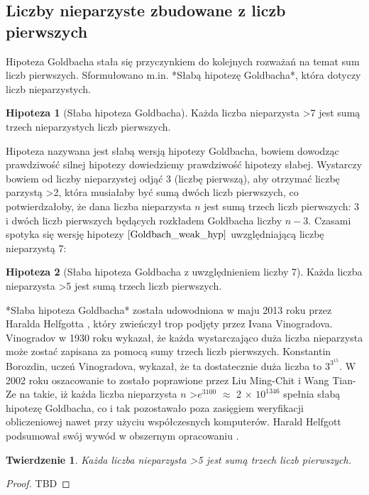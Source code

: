 \documentclass[10pt,onecolumn]{article}
\newtheorem{theorem}{Twierdzenie}
\theoremstyle{definition}
\theoremstyle{hypothesis}
\newtheorem{hypothesis}{Hipoteza}
\theoremstyle{capability}
\begin{document}
\subsection{Liczby nieparzyste zbudowane z liczb pierwszych}

Hipoteza Goldbacha stała się przyczynkiem do kolejnych rozważań na temat sum liczb pierwszych. Sformułowano m.in. *Słabą hipotezę Goldbacha*, która dotyczy liczb nieparzystych.

\begin{hypothesis}[Słaba hipoteza Goldbacha]
Każda liczba nieparzysta \textgreater 7 jest sumą trzech nieparzystych liczb pierwszych.
\label{Goldbach_weak_hyp}
\end{hypothesis}

Hipoteza nazywana jest słabą wersją hipotezy Goldbacha, bowiem dowodząc prawdziwość silnej hipotezy dowiedziemy prawdziwość hipotezy słabej. Wystarczy bowiem od liczby nieparzystej odjąć 3 (liczbę pierwszą), aby otrzymać liczbę parzystą \textgreater 2, która musiałaby być sumą dwóch liczb pierwszych, co potwierdzałoby, że dana liczba nieparzysta $n$ jest sumą trzech liczb pierwszych: 3 i dwóch liczb pierwszych będących rozkładem Goldbacha liczby $n-3$. Czasami spotyka się wersję hipotezy $\ref{Goldbach_weak_hyp}$ uwzględniającą liczbę nieparzystą 7:

\begin{hypothesis}[Słaba hipoteza Goldbacha z uwzględnieniem liczby 7]
Każda liczba nieparzysta \textgreater 5 jest sumą trzech liczb pierwszych.
\label{Goldbach_weak_hyp_with_seven}
\end{hypothesis}

*Słaba hipoteza Goldbacha* została udowodniona w maju 2013 roku przez Haralda Helfgotta \cite{helfgott2013}, który zwieńczył trop podjęty przez Ivana Vinogradova. Vinogradov w 1930 roku wykazał, że każda wystarczająco duża liczba nieparzysta może zostać zapisana za pomocą sumy trzech liczb pierwszych. Konstantin Borozdin, uczeń Vinogradova, wykazał, że ta dostatecznie duża liczba to $3^{3^{15}}$. W 2002 roku oszacowanie to zostało poprawione przez Liu Ming-Chit i Wang Tian-Ze na takie, iż każda liczba nieparzysta $n$ \textgreater $e^{3100}$  $\approx$ 2 $\times$ $10^{1346}$ spełnia słabą hipotezę Goldbacha, co i tak pozostawało poza zasięgiem weryfikacji obliczeniowej nawet przy użyciu współczesnych komputerów. Harald Helfgott podsumował swój wywód w obszernym opracowaniu \cite{helfgott2015}.

\begin{theorem}
Każda liczba nieparzysta \textgreater 5 jest sumą trzech liczb pierwszych.
\end{theorem}
\begin{proof}
TBD
\end{proof}
\end{document}
